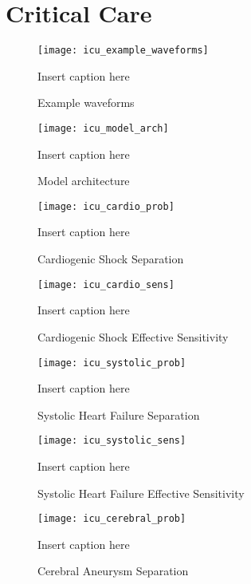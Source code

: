 \chapter{Critical Care}

\begin{figure}
\texttt{[image: icu\_example\_waveforms]}
\caption{Example waveforms}
\vspace{12px}
Insert caption here
\label{fig:icu_example_waveforms}
\end{figure}

\begin{figure}
\texttt{[image: icu\_model\_arch]}
\caption{Model architecture}
\vspace{12px}
Insert caption here
\label{fig:icu_model_arch}
\end{figure}

\begin{figure}
\texttt{[image: icu\_cardio\_prob]}
\caption{Cardiogenic Shock Separation}
\vspace{12px}
Insert caption here
\label{fig:icu_cardio_prob}
\end{figure}

\begin{figure}
\texttt{[image: icu\_cardio\_sens]}
\caption{Cardiogenic Shock Effective Sensitivity}
\vspace{12px}
Insert caption here
\label{fig:icu_cardio_sens}
\end{figure}

\begin{figure}
\texttt{[image: icu\_systolic\_prob]}
\caption{Systolic Heart Failure Separation}
\vspace{12px}
Insert caption here
\label{fig:icu_systolic_prob}
\end{figure}

\begin{figure}
\texttt{[image: icu\_systolic\_sens]}
\caption{Systolic Heart Failure Effective Sensitivity}
\vspace{12px}
Insert caption here
\label{fig:icu_systolic_sens}
\end{figure}

\begin{figure}
\texttt{[image: icu\_cerebral\_prob]}
\caption{Cerebral Aneurysm Separation}
\vspace{12px}
Insert caption here
\label{fig:icu_cerebral_prob}
\end{figure}

